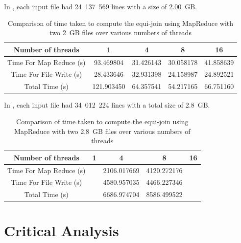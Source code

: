 \documentclass[11pt,twocolumn]{witseiepaper}
\begin{document}
In , each input file had 24~137~569  lines with a size of 2.00~GB. 

\begin{table} [t]
	\centering
	\caption{Comparison of time taken to compute the equi-join using MapReduce with two 2~GB files over various numbers of threads}
	\label{tab:results3}
	
	\begin{tabular}{|c|c|c|c|c|}
		\hline 
		Number of threads & 1 & 4 & 8 &16\\ 
		\hline
		\hline
		Time For Map Reduce (s) & 93.469804 & 31.426143 & 30.058178 & 41.858639\\ 
		\hline 
		Time For File Write (s) & 28.433646 & 32.931398& 24.158987 & 24.892521\\ 
		\hline 
		Total Time (s) & 121.903450 & 64.357541 & 54.217165 & 66.751160 \\ 
		\hline 
	\end{tabular} 
\end{table}


In , each input file had 34~012~224   lines with a total size of 2.8~GB. 

\begin{table} [t]
	\centering
	\caption{Comparison of time taken to compute the equi-join using MapReduce with two 2.8~GB files over various numbers of threads}
	\label{tab:results4}
	
	\begin{tabular}{|c|c|c|c|c|}
		\hline 
		Number of threads & 1 & 4 & 8 &16\\ 
		\hline
		\hline
		Time For Map Reduce (s) &  & 2106.017669 & 4120.272176 &  \\ 
		\hline 
		Time For File Write (s) &  & 4580.957035 & 4466.227346 & \\ 
		\hline 
		Total Time (s) &  & 6686.974704 & 8586.499522 &  \\ 
		\hline 
	\end{tabular} 
\end{table}

\section{Critical Analysis}
\end{document}
